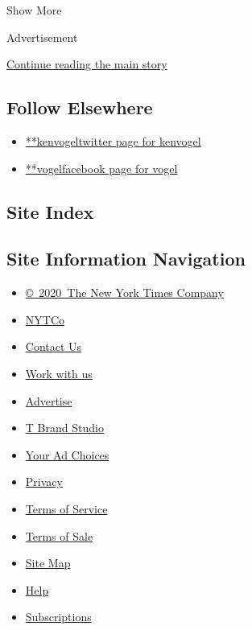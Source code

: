 Show More

Advertisement

\protect\hyperlink{after-mid2}{Continue reading the main story}

\hypertarget{follow-elsewhere}{%
\subsection{Follow Elsewhere}\label{follow-elsewhere}}

\begin{itemize}
\tightlist
\item
  \href{https://twitter.com/kenvogel}{**kenvogeltwitter page for
  kenvogel}
\item
  \href{https://www.facebook.com/vogel}{**vogelfacebook page for vogel}
\end{itemize}

\hypertarget{site-index}{%
\subsection{Site Index}\label{site-index}}

\hypertarget{site-information-navigation}{%
\subsection{Site Information
Navigation}\label{site-information-navigation}}

\begin{itemize}
\tightlist
\item
  \href{https://help.nytimes.com/hc/en-us/articles/115014792127-Copyright-notice}{©~2020~The
  New York Times Company}
\end{itemize}

\begin{itemize}
\tightlist
\item
  \href{https://www.nytco.com/}{NYTCo}
\item
  \href{https://help.nytimes.com/hc/en-us/articles/115015385887-Contact-Us}{Contact
  Us}
\item
  \href{https://www.nytco.com/careers/}{Work with us}
\item
  \href{https://nytmediakit.com/}{Advertise}
\item
  \href{http://www.tbrandstudio.com/}{T Brand Studio}
\item
  \href{https://www.nytimes.com/privacy/cookie-policy\#how-do-i-manage-trackers}{Your
  Ad Choices}
\item
  \href{https://www.nytimes.com/privacy}{Privacy}
\item
  \href{https://help.nytimes.com/hc/en-us/articles/115014893428-Terms-of-service}{Terms
  of Service}
\item
  \href{https://help.nytimes.com/hc/en-us/articles/115014893968-Terms-of-sale}{Terms
  of Sale}
\item
  \href{https://spiderbites.nytimes.com}{Site Map}
\item
  \href{https://help.nytimes.com/hc/en-us}{Help}
\item
  \href{https://www.nytimes.com/subscription?campaignId=37WXW}{Subscriptions}
\end{itemize}
